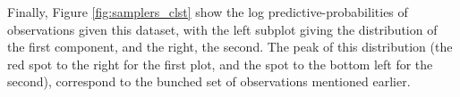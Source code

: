 Finally, Figure \ref{fig:samplers_clst} show the log predictive-probabilities of observations given this dataset, with the left subplot giving the distribution of
the first component, and the right, the second. The peak of this distribution (the red spot to the right for the first plot, and the spot to the bottom left for the second),
correspond to the bunched set of observations mentioned earlier.
%

